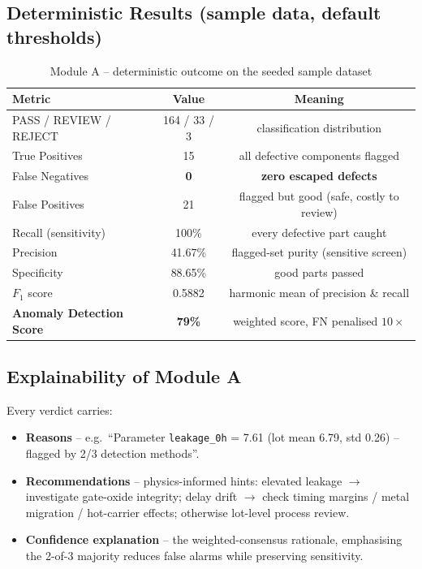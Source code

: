 \documentclass[11pt,a4paper]{article}
\begin{document}
\subsection{Deterministic Results (sample data, default thresholds)}
\begin{table}[h]
  \centering
  \caption{Module A -- deterministic outcome on the seeded sample dataset}
  \vspace{0.3cm}
  \begin{tabular}{lcc}
    \toprule
    \textbf{Metric} & \textbf{Value} & \textbf{Meaning} \\
    \midrule
    PASS / REVIEW / REJECT & 164 / 33 / 3 & classification distribution \\
    True Positives  & 15 & all defective components flagged \\
    False Negatives & \textbf{0}  & \textbf{zero escaped defects} \\
    False Positives & 21 & flagged but good (safe, costly to review) \\
    Recall (sensitivity) & 100\% & every defective part caught \\
    Precision & 41.67\% & flagged-set purity (sensitive screen) \\
    Specificity & 88.65\% & good parts passed \\
    $F_1$ score & 0.5882 & harmonic mean of precision \& recall \\
    \textbf{Anomaly Detection Score} & \textbf{79\%} & weighted score, FN penalised $10\times$ \\
    \bottomrule
  \end{tabular}
\end{table}

\subsection{Explainability of Module A}
Every verdict carries:
\begin{itemize}[leftmargin=1.5em]
  \item \textbf{Reasons} -- e.g.\ ``Parameter \texttt{leakage\_0h} = 7.61 (lot mean 6.79,
        std 0.26) -- flagged by 2/3 detection methods''.
  \item \textbf{Recommendations} -- physics-informed hints: elevated leakage $\rightarrow$
        investigate gate-oxide integrity; delay drift $\rightarrow$ check timing margins /
        metal migration / hot-carrier effects; otherwise lot-level process review.
  \item \textbf{Confidence explanation} -- the weighted-consensus rationale, emphasising the
        2-of-3 majority reduces false alarms while preserving sensitivity.
\end{itemize}
\end{document}
